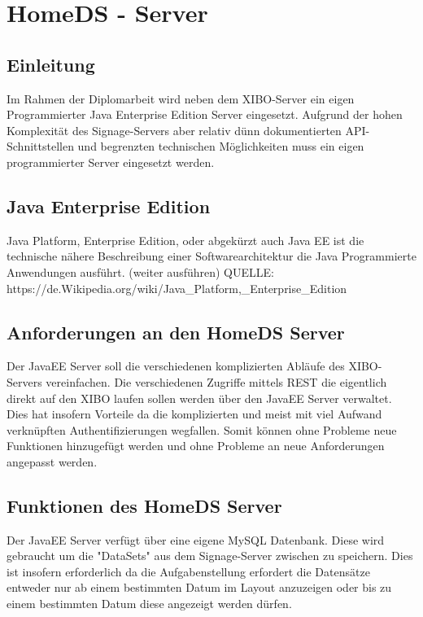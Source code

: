 \chapter{HomeDS - Server}
\section{Einleitung}\label{sec:einleitung}
Im Rahmen der Diplomarbeit wird neben dem XIBO-Server ein eigen Programmierter Java Enterprise Edition Server eingesetzt. Aufgrund der hohen Komplexität des Signage-Servers aber relativ dünn dokumentierten API-Schnittstellen und begrenzten technischen Möglichkeiten muss ein eigen programmierter Server eingesetzt werden. 

\section{Java Enterprise Edition}\label{sec:javaee}
Java Platform, Enterprise Edition, oder abgekürzt auch Java EE ist die technische nähere Beschreibung einer Softwarearchitektur die Java Programmierte Anwendungen ausführt.
(weiter ausführen)
QUELLE: https://de.Wikipedia.org/wiki/Java_Platform,_Enterprise_Edition

\section{Anforderungen an den HomeDS Server}\label{sec:homeds}
Der JavaEE Server soll die verschiedenen komplizierten Abläufe des XIBO-Servers vereinfachen. Die verschiedenen Zugriffe mittels REST die eigentlich direkt auf den XIBO laufen sollen werden über den JavaEE Server verwaltet. Dies hat insofern Vorteile da die komplizierten und meist mit viel Aufwand verknüpften Authentifizierungen wegfallen. Somit können ohne Probleme neue Funktionen hinzugefügt werden und ohne Probleme an neue Anforderungen angepasst werden.

\section{Funktionen des HomeDS Server}\label{sec:homedsfunction}
Der JavaEE Server verfügt über eine eigene MySQL Datenbank. Diese wird gebraucht um die "DataSets" aus dem Signage-Server zwischen zu speichern. Dies ist insofern erforderlich da die Aufgabenstellung erfordert die Datensätze entweder nur ab einem bestimmten Datum im Layout anzuzeigen oder bis zu einem bestimmten Datum diese angezeigt werden dürfen. 

